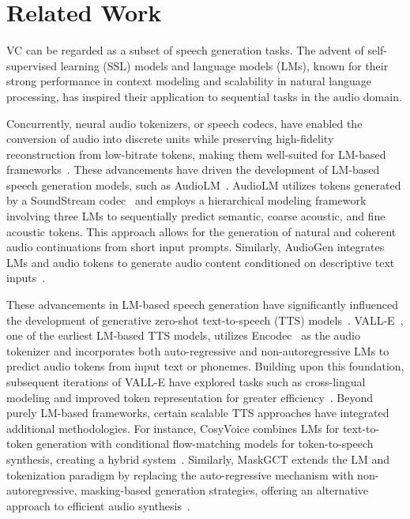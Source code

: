 \section{Related Work}
\label{sec:related_works}
VC can be regarded as a subset of speech generation tasks. The advent of self-supervised learning (SSL) models and language models (LMs), known for their strong performance in context modeling and scalability in natural language processing, has inspired their application to sequential tasks in the audio domain.

Concurrently, neural audio tokenizers, or speech codecs, have enabled the conversion of audio into discrete units while preserving high-fidelity reconstruction from low-bitrate tokens, making them well-suited for LM-based frameworks~\cite{wu2024towards}. These advancements have driven the development of LM-based speech generation models, such as AudioLM~\cite{borsos2023audiolm}. AudioLM utilizes tokens generated by a SoundStream codec~\cite{zeghidour2021soundstream} and employs a hierarchical modeling framework involving three LMs to sequentially predict semantic, coarse acoustic, and fine acoustic tokens. This approach allows for the generation of natural and coherent audio continuations from short input prompts. Similarly, AudioGen integrates LMs and audio tokens to generate audio content conditioned on descriptive text inputs~\cite{kreuk2023audiogen}.

These advancements in LM-based speech generation have significantly influenced the development of generative zero-shot text-to-speech (TTS) models~\cite{kharitonov2023speak, peng2024voicecraft, du2024cosyvoice2}. VALL-E~\cite{wang2023neural, microvalle}, one of the earliest LM-based TTS models, utilizes Encodec~\cite{fossez2023high} as the audio tokenizer and incorporates both auto-regressive and non-autoregressive LMs to predict audio tokens from input text or phonemes. Building upon this foundation, subsequent iterations of VALL-E have explored tasks such as cross-lingual modeling and improved token representation for greater efficiency~\cite{zhang2023speak, chen2024vall}. Beyond purely LM-based frameworks, certain scalable TTS approaches have integrated additional methodologies. For instance, CosyVoice combines LMs for text-to-token generation with conditional flow-matching models for token-to-speech synthesis, creating a hybrid system~\cite{du2024cosyvoice}. Similarly, MaskGCT extends the LM and tokenization paradigm by replacing the auto-regressive mechanism with non-autoregressive, masking-based generation strategies, offering an alternative approach to efficient audio synthesis~\cite{wang2024maskgct}.

